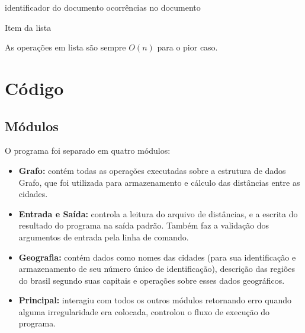 \documentclass[12pt]{article}
\begin{document}
\begin{algorithm}[h!]
\begin{footnotesize}
	identificador do documento\;
	ocorrências no documento\;
\caption{Item da lista}
\end{footnotesize}
\end{algorithm}

As operações em lista são sempre $O(n)$ para o pior caso.

\section{Código}

\subsection{Módulos}
O programa foi separado em quatro módulos:
\begin{itemize}
\item \textbf{Grafo:} contém todas as operações executadas sobre a 
estrutura de dados Grafo, que foi utilizada para armazenamento e cálculo
das distâncias entre as cidades.
\item \textbf{Entrada e Saída:} controla a leitura do arquivo de distâncias,
e a escrita do resultado do programa na saída padrão. Também faz a validação dos 
argumentos de entrada pela linha de comando.
\item \textbf{Geografia:} contém dados como nomes das cidades (para sua identificação
e armazenamento de seu número único de identificação), descrição das regiões do brasil
segundo suas capitais e operações sobre esses dados geográficos.
\item \textbf{Principal:} interagiu com todos os outros módulos retornando erro
quando alguma irregularidade era colocada, controlou o fluxo de execução do
programa.
\end{itemize}
\end{document}
